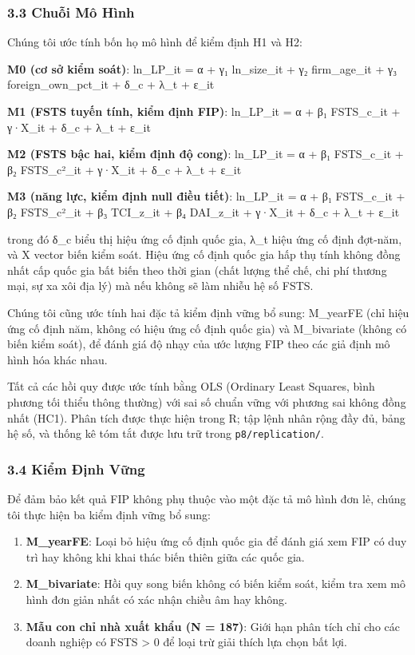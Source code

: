 \documentclass[12pt,a4paper]{article}
\providecommand{\tightlist}{\setlength{\itemsep}{0pt}\setlength{\parskip}{0pt}}
\begin{document}
\hypertarget{33-chuux1ed7i-muxf4-huxecnh}{%
\subsubsection{3.3 Chuỗi Mô Hình}\label{33-chuux1ed7i-muxf4-huxecnh}}

Chúng tôi ước tính bốn họ mô hình để kiểm định H1 và H2:

\textbf{M0 (cơ sở kiểm soát)}: ln\_LP\_it = α + γ₁ ln\_size\_it + γ₂
firm\_age\_it + γ₃ foreign\_own\_pct\_it + δ\_c + λ\_t + ε\_it

\textbf{M1 (FSTS tuyến tính, kiểm định FIP)}: ln\_LP\_it = α + β₁
FSTS\_c\_it + γ·X\_it + δ\_c + λ\_t + ε\_it

\textbf{M2 (FSTS bậc hai, kiểm định độ cong)}: ln\_LP\_it = α + β₁
FSTS\_c\_it + β₂ FSTS\_c²\_it + γ·X\_it + δ\_c + λ\_t + ε\_it

\textbf{M3 (năng lực, kiểm định null điều tiết)}: ln\_LP\_it = α + β₁
FSTS\_c\_it + β₂ FSTS\_c²\_it + β₃ TCI\_z\_it + β₄ DAI\_z\_it + γ·X\_it
+ δ\_c + λ\_t + ε\_it

trong đó δ\_c biểu thị hiệu ứng cố định quốc gia, λ\_t hiệu ứng cố định
đợt-năm, và X vector biến kiểm soát. Hiệu ứng cố định quốc gia hấp thụ
tính không đồng nhất cấp quốc gia bất biến theo thời gian (chất lượng
thể chế, chi phí thương mại, sự xa xôi địa lý) mà nếu không sẽ làm nhiễu
hệ số FSTS.

Chúng tôi cũng ước tính hai đặc tả kiểm định vững bổ sung: M\_yearFE
(chỉ hiệu ứng cố định năm, không có hiệu ứng cố định quốc gia) và
M\_bivariate (không có biến kiểm soát), để đánh giá độ nhạy của ước
lượng FIP theo các giả định mô hình hóa khác nhau.

Tất cả các hồi quy được ước tính bằng OLS (Ordinary Least Squares, bình
phương tối thiểu thông thường) với sai số chuẩn vững với phương sai
không đồng nhất (HC1). Phân tích được thực hiện trong R; tập lệnh nhân
rộng đầy đủ, bảng hệ số, và thống kê tóm tắt được lưu trữ trong
\texttt{p8/replication/}.

\hypertarget{34-kiux1ec3m-ux111ux1ecbnh-vux1eefng}{%
\subsubsection{3.4 Kiểm Định
Vững}\label{34-kiux1ec3m-ux111ux1ecbnh-vux1eefng}}

Để đảm bảo kết quả FIP không phụ thuộc vào một đặc tả mô hình đơn lẻ,
chúng tôi thực hiện ba kiểm định vững bổ sung:

\begin{enumerate}
\def\labelenumi{\arabic{enumi}.}
\tightlist
\item
  \textbf{M\_yearFE}: Loại bỏ hiệu ứng cố định quốc gia để đánh giá xem
  FIP có duy trì hay không khi khai thác biến thiên giữa các quốc gia.
\item
  \textbf{M\_bivariate}: Hồi quy song biến không có biến kiểm soát, kiểm
  tra xem mô hình đơn giản nhất có xác nhận chiều âm hay không.
\item
  \textbf{Mẫu con chỉ nhà xuất khẩu (N = 187)}: Giới hạn phân tích chỉ
  cho các doanh nghiệp có FSTS \textgreater{} 0 để loại trừ giải thích
  lựa chọn bất lợi.
\end{enumerate}
\end{document}
